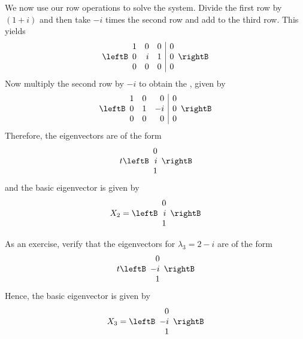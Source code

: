 \begin{solution}
We now use our row operations to solve the system.
Divide the first row by $\left( 1+i\right) $ and then take 
$-i$ times the second row and add to the third row. This yields
\begin{equation*}
\leftB
\begin{array}{rrr|r}
1 & 0 & 0 & 0 \\
0 & i & 1 & 0 \\
0 & 0 & 0 & 0
\end{array}
\rightB
\end{equation*}
Now multiply the second row by $-i$ to obtain the \rref, given by 
\begin{equation*}
\leftB
\begin{array}{rrr|r}
1 & 0 &  0 & 0 \\
0 & 1 & -i & 0 \\
0 & 0 &  0 & 0
\end{array}
\rightB
\end{equation*}
Therefore, the eigenvectors are of the form
\begin{equation*}
t\leftB
\begin{array}{r}
0 \\
i \\
1
\end{array}
\rightB 
\end{equation*}
and the basic eigenvector is given by
\begin{equation*}
X_2 =
\leftB
\begin{array}{r}
0 \\
i \\
1
\end{array}
\rightB
\end{equation*}

As an exercise, verify that the eigenvectors for $\lambda_3 =2-i$ are of the form 
\begin{equation*}
t\leftB
\begin{array}{r}
 0 \\
-i \\
 1
\end{array}
\rightB 
\end{equation*}
Hence, the basic eigenvector is given by 
\begin{equation*}
X_3 = \leftB
\begin{array}{r}
 0 \\
-i \\
 1
\end{array}
\rightB 
\end{equation*}


\end{solution}
